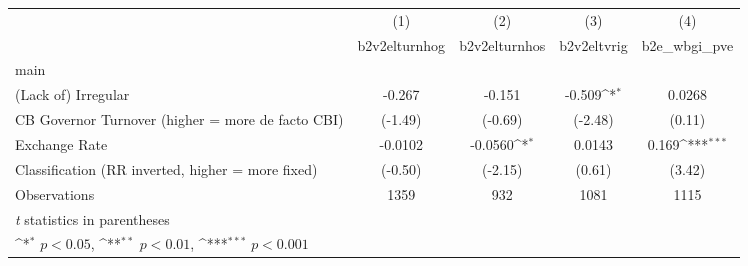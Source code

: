 {
\def\sym#1{\ifmmode^{#1}\else\(^{#1}\)\fi}
\begin{tabular}{l*{4}{c}}
\hline\hline
                    &\multicolumn{1}{c}{(1)}&\multicolumn{1}{c}{(2)}&\multicolumn{1}{c}{(3)}&\multicolumn{1}{c}{(4)}\\
                    &\multicolumn{1}{c}{b2v2elturnhog}&\multicolumn{1}{c}{b2v2elturnhos}&\multicolumn{1}{c}{b2v2eltvrig}&\multicolumn{1}{c}{b2e\_wbgi\_pve}\\
\hline
main                &                     &                     &                     &                     \\
(Lack of) Irregular &      -0.267         &      -0.151         &      -0.509\sym{*}  &      0.0268         \\
CB Governor Turnover (higher = more de facto CBI)&     (-1.49)         &     (-0.69)         &     (-2.48)         &      (0.11)         \\
[1em]
Exchange Rate       &     -0.0102         &     -0.0560\sym{*}  &      0.0143         &       0.169\sym{***}\\
Classification (RR inverted, higher = more fixed)&     (-0.50)         &     (-2.15)         &      (0.61)         &      (3.42)         \\
\hline
Observations        &        1359         &         932         &        1081         &        1115         \\
\hline\hline
\multicolumn{5}{l}{\footnotesize \textit{t} statistics in parentheses}\\
\multicolumn{5}{l}{\footnotesize \sym{*} \(p<0.05\), \sym{**} \(p<0.01\), \sym{***} \(p<0.001\)}\\
\end{tabular}
}
